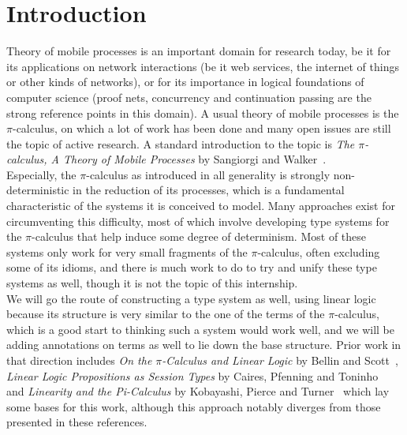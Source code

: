 
\section*{Introduction}

Theory of mobile processes is an important domain for research today, be it for its applications on network interactions (be it web services, the internet of things or other kinds of networks), or for its importance in logical foundations of computer science (proof nets, concurrency and continuation passing are the strong reference points in this domain). A usual theory of mobile processes is the $\pi$-calculus, on which a lot of work has been done and many open issues are still the topic of active research. A standard introduction to the topic is \emph{The $\pi$-calculus, A Theory of Mobile Processes} by Sangiorgi and Walker~\cite{sangiorgi-2001-pi-calculus}.\\

Especially, the $\pi$-calculus as introduced in all generality is strongly non-deterministic in the reduction of its processes, which is a fundamental characteristic of the systems it is conceived to model. Many approaches exist for circumventing this difficulty, most of which involve developing type systems for the $\pi$-calculus that help induce some degree of determinism. Most of these systems only work for very small fragments of the $\pi$-calculus, often excluding some of its idioms, and there is much work to do to try and unify these type systems as well, though it is not the topic of this internship.\\

We will go the route of constructing a type system as well, using linear logic because its structure is very similar to the one of the terms of the $\pi$-calculus, which is a good start to thinking such a system would work well, and we will be adding annotations on terms as well to lie down the base structure. Prior work in that direction includes \emph{On the $\pi$-Calculus and Linear Logic} by Bellin and Scott~\cite{bellin-1994-calculus}, \emph{Linear Logic Propositions as Session Types} by Caires, Pfenning and Toninho~\cite{caires-2016-linear} and \emph{Linearity and the Pi-Calculus} by Kobayashi, Pierce and Turner~\cite{kobayashi-1999-linearity} which lay some bases for this work, although this approach notably diverges from those presented in these references.\\

